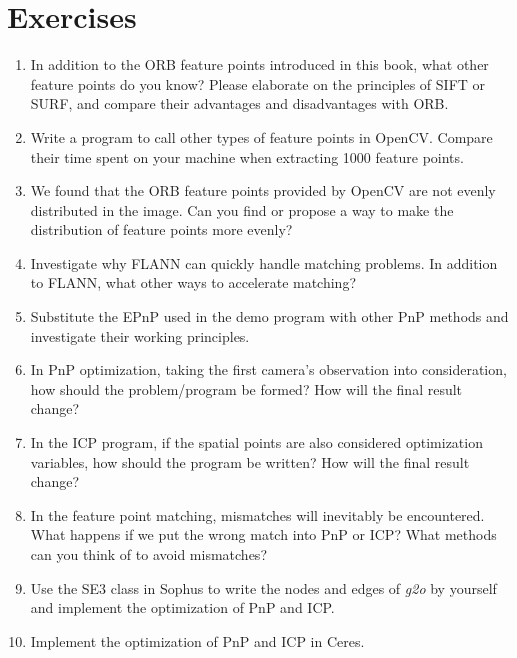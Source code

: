 \section*{Exercises}
\begin{enumerate}
	\item In addition to the ORB feature points introduced in this book, what other feature points do you know? Please elaborate on the principles of SIFT or SURF, and compare their advantages and disadvantages with ORB.
	\item Write a program to call other types of feature points in OpenCV. Compare their time spent on your machine when extracting 1000 feature points.
	\item[\optional] We found that the ORB feature points provided by OpenCV are not evenly distributed in the image. Can you find or propose a way to make the distribution of feature points more evenly?
	\item Investigate why FLANN can quickly handle matching problems. In addition to FLANN, what other ways to accelerate matching?
	\item Substitute the EPnP used in the demo program with other PnP methods and investigate their working principles.
	\item In PnP optimization, taking the first camera's observation into consideration, how should the problem/program be formed? How will the final result change?
	\item In the ICP program, if the spatial points are also considered optimization variables, how should the program be written? How will the final result change?
	\item[\optional] In the feature point matching, mismatches will inevitably be encountered. What happens if we put the wrong match into PnP or ICP? What methods can you think of to avoid mismatches?
	\item[\optional] Use the SE3 class in Sophus to write the nodes and edges of \textit{g2o} by yourself and implement the optimization of PnP and ICP.
	\item[\optional] Implement the optimization of PnP and ICP in Ceres.
\end{enumerate}

